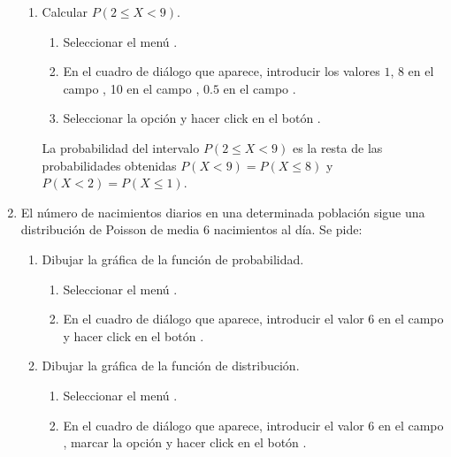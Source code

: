 \begin{enumerate}[leftmargin=*]
\begin{enumerate}
\item Calcular $P(2\leq X < 9)$.
\begin{indicacion}
\begin{enumerate}
\item Seleccionar el menú .
\item En el cuadro de diálogo que aparece, introducir los valores $1$, $8$ en el campo , 10 en el campo
, $0.5$ en el campo .
\item Seleccionar la opción  y hacer click en el botón .
\end{enumerate}
La probabilidad del intervalo $P(2\leq X<9)$ es la resta de las probabilidades obtenidas $P(X<9)=P(X\leq 8)$ y $P(X<2)=P(X\leq 1)$.
\end{indicacion}
\end{enumerate}


\item El número de nacimientos diarios en una determinada población sigue una distribución de Poisson de media 6
nacimientos al día. Se pide:
\begin{enumerate}
\item Dibujar la gráfica de la función de probabilidad.
\begin{indicacion}
\begin{enumerate}
\item Seleccionar el menú .
\item En el cuadro de diálogo que aparece, introducir el valor 6 en el campo  y hacer click en el botón
.
\end{enumerate}
\end{indicacion}

\item Dibujar la gráfica de la función de distribución.
\begin{indicacion}
\begin{enumerate}
\item Seleccionar el menú .
\item En el cuadro de diálogo que aparece, introducir el valor 6 en el campo , marcar la opción
 y hacer click en el botón .
\end{enumerate}
\end{indicacion}


\end{enumerate}
\end{enumerate}

